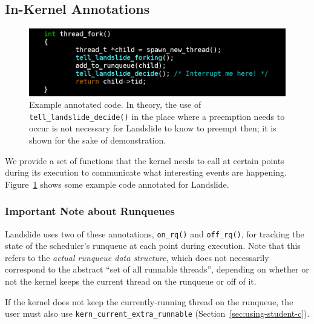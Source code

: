 \subsection{In-Kernel Annotations}
\label{sec:using-annotations}

\begin{figure}[h]
	\centering
	\includegraphics[width=\textwidth]{tell_landslide.png}
	\caption{Example annotated code. In theory, the use of \texttt{tell\_landslide\_decide()} in the place where a preemption needs to occur is not necessary for Landslide to know to preempt then; it is shown for the sake of demonstration.}
	\label{fig:tell-landslide}
\end{figure}

We provide a set of functions that the kernel needs to call at certain points during its execution to communicate what interesting events are happening. Figure~\ref{fig:tell-landslide} shows some example code annotated for Landslide.

\subsubsection{Important Note about Runqueues}
\label{sec:using-runqueue}
Landslide uses two of these annotations, \texttt{on\_rq()} and \texttt{off\_rq()}, for tracking the state of the scheduler's runqueue at each point during execution.
Note that this refers to the {\em actual runqueue data structure}, which does not necessarily correspond to the abstract ``set of all runnable threads'', depending on whether or not the kernel keeps the current thread on the runqueue or off of it.

If the kernel does not keep the currently-running thread on the runqueue, the user must also use \texttt{kern\_current\_extra\_runnable} (Section~\ref{sec:using-student-c}).

